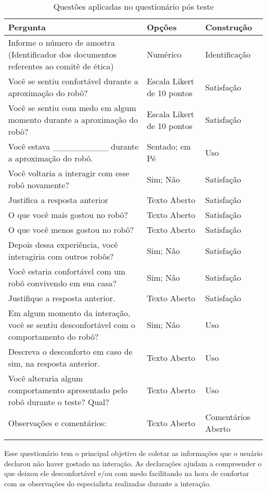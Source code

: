 \begin{longtable}{ m{7 cm} | m{4cm} | m{4cm} }
	\caption{Questões aplicadas no questionário pós teste }
	\label{tab:questoesposteste} \\	\hline
	Pergunta & Opções & Construção \\ \hline
	Informe o número de amostra (Identificador dos documentos referentes ao comitê de ética) & Numérico & Identificação \\ \hline
	Você se sentiu confortável durante a aproximação do robô? & Escala Likert de 10 pontos & Satisfação \\ \hline
	Você se sentiu com medo em algum momento durante a aproximação do robô? & Escala Likert de 10 pontos & Satisfação \\ \hline
	Você estava \_\_\_\_\_\_\_\_\_ durante a aproximação do robô. & Sentado; em Pé & Uso \\ \hline
	Você voltaria a interagir com esse robô novamente? & Sim; Não & Satisfação \\ \hline
	Justifica a resposta anterior & Texto Aberto & Satisfação \\ \hline
	O que você mais gostou no robô? & Texto Aberto & Satisfação \\ \hline
	O que você menos gostou no robô? & Texto Aberto & Satisfação \\ \hline
	Depois dessa experiência, você interagiria com outros robôs? & Sim; Não & Satisfação \\ \hline
	Você estaria confortável com um robô convivendo em sua casa? & Sim; Não & Satisfação \\ \hline
	Justifique a resposta anterior. & Texto Aberto & Satisfação \\ \hline
	Em algum momento da interação, você se sentiu desconfortável com o comportamento do robô? & Sim; Não & Uso \\ \hline
	Descreva o desconforto em caso de sim, na resposta anterior. & Texto Aberto & Uso \\ \hline
	Você alteraria algum comportamento apresentado pelo robô durante o teste? Qual? & Texto Aberto & Uso \\ \hline
	Observações e comentários: & Texto Aberto & Comentários Aberto \\ \hline
	\smallcaption{Fonte: O autor.}
\end{longtable}

Esse questionário tem o principal objetivo de coletar as informações que o usuário declarou não haver gostado na interação. As declarações ajudam a compreender o que deixou ele desconfortável e/ou com medo facilitando na hora de confortar com as observações do especialista realizadas durante a interação.

